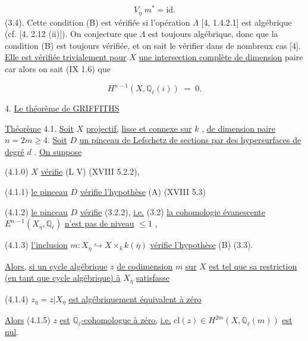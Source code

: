 \begin{equation}\tag{3.3.5}
V_{\overline{\eta}} \; m^* = \mathrm{id} .
\end{equation}
(3.4). Cette condition (B) est vérifiée si l'opération $\Lambda$ [4, 1.4.2.1] est algébrique (cf. [4, 2.12 (ii)]). On conjecture que $\Lambda$ est toujours algébrique, donc que la condition (B) est toujours vérifiée, et on sait le vérifier dans de nombreux cas [4]. \underline{Elle est vérifiée trivialement pour} $X$ \underline{une intersection complète de dimension} paire car alors on sait (IX 1.6) que

\begin{equation}\tag{3.4.1}
H^{n-1}(X,\mathbb{Q}_{\ell}(i)) \;=\; 0 .
\end{equation}



4. \underline{Le théorème de GRIFFITHS}

\underline{Théorème} 4.1. \underline{Soit} $X$ \underline{projectif,} \underline{lisse et connexe sur} $k$ , \underline{de dimension paire} $n = 2m \geq 4$. \underline{Soit} $D$ \underline{un pinceau de Lefschetz de sections par des hypersurfaces de degré} $d$ . \underline{On suppose}

(4.1.0) $X$ \underline{vérifie} (L V) (XVIII 5.2.2),

(4.1.1) \underline{le pinceau} $D$ \underline{vérifie l'hypothèse} (A) (XVIII 5.3)

(4.1.2) \underline{le pinceau} $D$ \underline{vérifie} (3.2.2), \underline{i.e.} (3.2) \underline{la cohomologie évanescente} $E^{n-1}(X_{\overline{\eta}},\mathbb{Q}_{\ell})$ \underline{n'est pas  de niveau} $\leq 1$ ,

(4.1.3) \underline{l'inclusion} $m : X_{\overline{\eta}} \hookrightarrow X \times_{k} k(\overline{\eta})$ \underline{vérifie l'hypothèse} (B) (3.3).

\underline{Alors,} \underline{si un cycle algébrique} $z$ \underline{de codimension} $m$ \underline{sur} $X$ \underline{est tel que sa restriction (en tant que cycle algébrique) à} $X_{\overline{\eta}}$ \underline{satisfasse}

(4.1.4) $z_{\overline{\eta}} = z|X_{\overline{\eta}}$ \underline{est algébriquement équivalent à zéro}

\underline{Alors} (4.1.5) $z$ \underline{est} \underline{$\mathbb{Q}_{\ell}$-cohomologue à zéro,} \underline{i.e.} $\mathrm{cl}(z) \in H^{2m}(X,\mathbb{Q}_{\ell}(m))$ \underline{est nul}.


